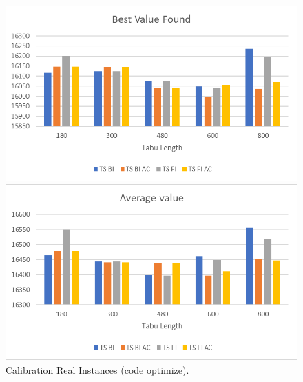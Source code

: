 		\begin{figure}[p]
			\centering
			\includegraphics[width=\linewidth]{img/RI-calibration-SC-2}
			
			\vspace{1cm}
			
			\includegraphics[width=\linewidth]{img/RI-calibration-SC-avg-2}
			
			\caption{Calibration Real Instances (code optimize).}
			\label{fig:ri-calibration-sc-opt}
		\end{figure}
	
	
		
			
		
		
			
			
		
			
		
			
			
			
	
	
	
		
		
	